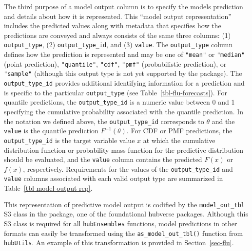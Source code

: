\documentclass[
  article,
  shortnames,
  notitle]{jss}
\begin{document}
The third purpose of a model output column is to specify the models
prediction and details about how it is represented. This ``model output
representation'' includes the predicted values along with metadata that
specifies how the predictions are conveyed and always consists of the
same three columns: (1) \texttt{output\_type}, (2)
\texttt{output\_type\_id}, and (3) \texttt{value}. The
\texttt{output\_type} column defines how the prediction is represented
and may be one of \texttt{"mean"} or \texttt{"median"} (point
prediction), \texttt{"quantile"}, \texttt{"cdf"}, \texttt{"pmf"}
(probabilistic prediction), or \texttt{"sample"} (although this output
type is not yet supported by the  package). The
\texttt{output\_type\_id} provides additional identifying information
for a prediction and is specific to the particular \texttt{output\_type}
(see Table~\ref{tbl-flu-forecasts}). For quantile predictions, the
\texttt{output\_type\_id} is a numeric value between 0 and 1 specifying
the cumulative probability associated with the quantile prediction. In
the notation we defined above, the \texttt{output\_type\_id} corresponds
to \(\theta\) and the \texttt{value} is the quantile prediction
\(F^{-1}(\theta)\). For CDF or PMF predictions, the
\texttt{output\_type\_id} is the target variable value \(x\) at which
the cumulative distribution function or probability mass function for
the predictive distribution should be evaluated, and the \texttt{value}
column contains the predicted \(F(x)\) or \(f(x)\), respectively.
Requirements for the values of the \texttt{output\_type\_id} and
\texttt{value} columns associated with each valid output type are
summarized in Table~\ref{tbl-model-output-rep}.

This representation of predictive model output is codified by the
\texttt{model\_out\_tbl} S3 class in the  package, one of
the foundational hubverse packages. Although this S3 class is required
for all \texttt{hubEnsembles} functions, model predictions in other
formats can easily be transformed using the
\texttt{as\_model\_out\_tbl()} function from \texttt{hubUtils}. An
example of this transformation is provided in Section~\ref{sec-flu}.
\end{document}
